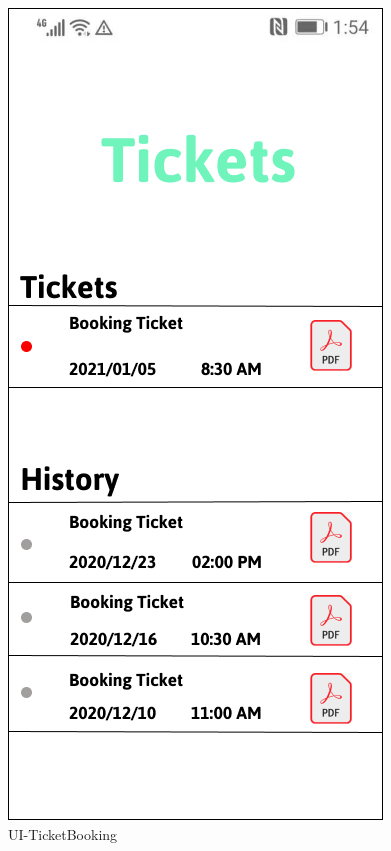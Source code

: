 \documentclass[a4paper,12pt]{report}
\begin{document}
\begin{figure}[H]
	\begin{minipage}[t]{0.56\linewidth}
		\centering
		\includegraphics[scale=0.5]{UI-TicketBooking}
		\caption{UI-TicketBooking}
		\label{fig:UI-TicketBooking}
	\end{minipage}%
	\begin{minipage}[t]{0.56\linewidth}
		\centering

\end{minipage}
\end{figure}
\end{document}
